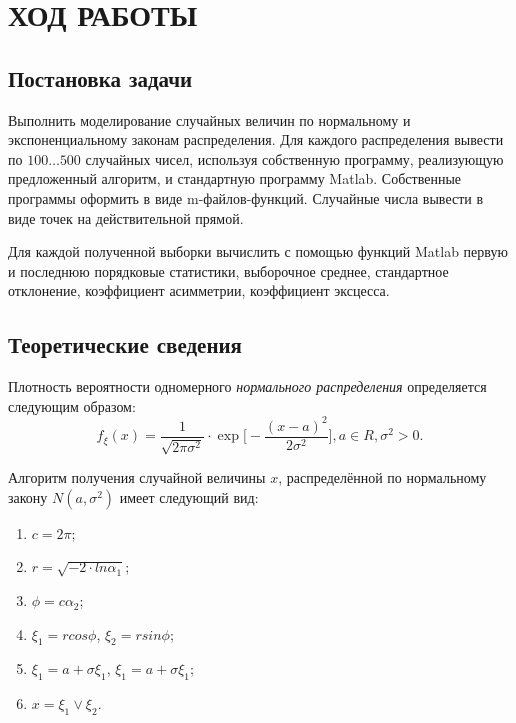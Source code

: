 \section{ХОД РАБОТЫ}

\subsection{Постановка задачи}

Выполнить моделирование случайных величин по нормальному и экспоненциальному законам распределения.
Для каждого распределения вывести по $100 \dots 500$ случайных чисел, используя собственную программу,
реализующую предложенный алгоритм, и стандартную программу Matlab.
Собственные программы оформить в виде m-файлов-функций.
Случайные числа вывести в виде точек на действительной прямой.

Для каждой полученной выборки вычислить с помощью функций Matlab первую и последнюю
порядковые статистики, выборочное среднее, стандартное отклонение,
коэффициент асимметрии, коэффициент эксцесса.

\subsection{Теоретические сведения}
\label{sub:theory}

Плотность вероятности одномерного \textit{нормального распределения} определяется следующим образом:
\begin{equation}
    f_{\xi}(x) =
    \dfrac{1}{\sqrt{2 \pi \sigma^2}} \cdot \exp \Big[-\dfrac{(x-a)^2}{2 \sigma^2} \Big], a \in R, \sigma^2 > 0.
\end{equation}

Алгоритм получения случайной величины $ x $, распределённой по нормальному
закону $ N (a, \sigma^2) $ имеет следующий вид:

\begin{enumerate}
  \item $ c = 2 \pi $;
  \item $ r = \sqrt{-2 \cdot ln \alpha_1} $;
  \item $ \phi = c \alpha_2 $;
  \item $ \xi_1 = r cos\phi $, $ \xi_2 = r sin\phi $;
  \item $ \xi_1 = a + \sigma \xi_1 $, $ \xi_1 = a + \sigma \xi_1 $;
  \item $ x = \xi_1 \vee  \xi_2 $.
\end{enumerate}

\newpage

